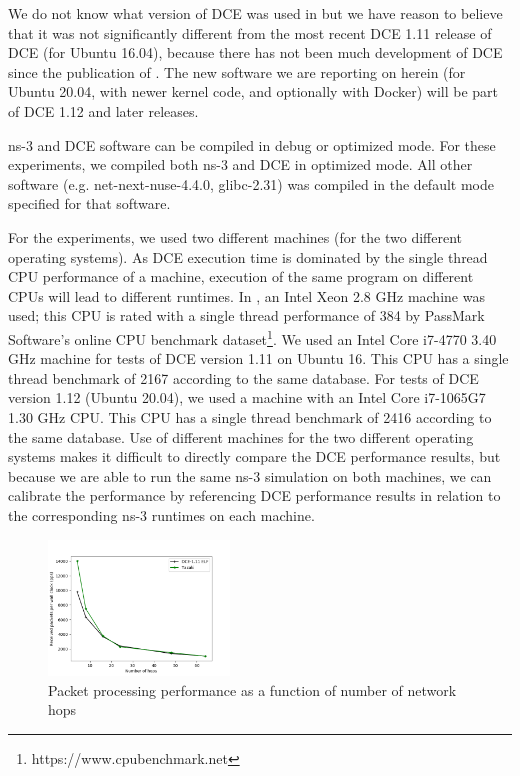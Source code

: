 \documentclass{sig-alternate}
\begin{document}
We do not know what version of DCE was used in \cite{Tazaki13} but we
have reason to believe that it was not significantly different from the
most recent DCE 1.11 release of DCE (for Ubuntu 16.04), because there
has not been much development of DCE since the publication of \cite{Tazaki13}.
The new software we are reporting on herein (for Ubuntu 20.04, with newer
kernel code, and optionally with Docker) will be part of DCE 1.12 and
later releases.

ns-3 and DCE software can be compiled in debug or optimized mode.  For
these experiments, we compiled both ns-3 and DCE in optimized mode.  All
other software (e.g. net-next-nuse-4.4.0, glibc-2.31) was compiled in
the default mode specified for that software.

For the experiments, we used two different machines (for the two different
operating systems).  As DCE execution time is dominated by the single thread
CPU performance of a machine, execution of the same program on different CPUs
will lead to
different runtimes.  In \cite{Tazaki13}, an Intel Xeon 2.8 GHz machine was
used; this CPU is rated with a single thread performance of 384 by PassMark
Software's online CPU benchmark dataset\footnote{https://www.cpubenchmark.net}.
We used an Intel Core i7-4770 3.40 GHz machine for tests of DCE version 1.11
on Ubuntu 16.  This CPU has a single thread benchmark of 2167 according
to the same database.  For tests of DCE version 1.12 (Ubuntu 20.04), we used
a machine with an Intel Core i7-1065G7 1.30 GHz CPU.  This CPU has a
single thread benchmark of 2416 according to the same database.  Use of
different machines for the two different operating systems makes it difficult
to directly compare the DCE performance results, but because we are able to
run the same ns-3 simulation on both machines, we can calibrate the
performance by referencing DCE performance results in relation to the
corresponding ns-3 runtimes on each machine.

\begin{figure}[h!]
  \centering
    \includegraphics[width=0.43\textwidth]{figs/hops-vs-pps.png}
  \caption{Packet processing performance as a function of number of network hops}
  \label{fig:hops-vs-pps}
\end{figure}
\end{document}
